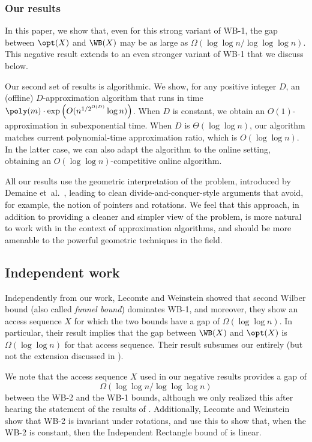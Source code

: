 \subsubsection{Our results} 


In this paper, we show that, even for this strong variant of WB-1, the gap between $\opt(X)$ and $\WB(X)$ may be as large as $\Omega(\log \log n/ \log \log \log n)$.  This negative result extends to an even stronger variant of WB-1 that we discuss below.
%
%


Our second set of results is algorithmic.
We show, for any positive integer $D$, an (offline) $D$-approximation algorithm that runs in time $\poly(m)\cdot \exp\left(O(n^{1/2^{\Omega(D)}}\log n)\right )$. 
When $D$ is constant, we obtain an $O(1)$-approximation in subexponential time. When $D$ is $\Theta(\log \log n)$, our algorithm matches current polynomial-time approximation ratio, which is $O(\log\log n)$. In the latter case, we can also adapt the algorithm to the online setting, obtaining an $O(\log\log n)$-competitive online algorithm.

All our results use the geometric interpretation of the problem, introduced by Demaine et~al.~\cite{DHIKP09}, leading to clean divide-and-conquer-style arguments that avoid, for example, the notion of pointers and rotations.
We feel that this approach, in addition to providing a cleaner and simpler view of the problem, is more natural to work with in the context of approximation algorithms, and should be more amenable to the powerful geometric techniques in the field. 
%
%




\subsection{Independent work}
Independently from our work, Lecomte and Weinstein \cite{LW19} showed that second Wilber bound (also called \emph{funnel bound}) dominates WB-1, and moreover, they show an access sequence $X$ for which the two bounds have a gap of $\Omega(\log\log n)$. 
In particular, their result implies that the gap between $\WB(X)$ and $\opt(X)$ is $\Omega(\log\log n)$ for that access sequence. Their result subsumes our  entirely (but not the extension discussed in ).    


We note that the access sequence $X$  used in our negative results  provides a gap of
%
\[
\Omega(\log\log n/\log\log\log n)
\]
 between the WB-2 and the WB-1 bounds, although we only realized this after hearing the statement of the results of \cite{LW19}. Additionally, Lecomte and Weinstein show that WB-2 is invariant under rotations, and use this to show that, when the WB-2 is constant, then the Independent Rectangle bound of \cite{DHIKP09} is linear.





